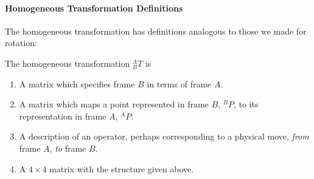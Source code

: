 \paragraph{Homogeneous Transformation Definitions}\label{HTDefs}
The homogeneous transformation has definitions analogous to those we made for rotation:


The homogeneous transformation $^A_BT$ is

\begin{enumerate}
  \item A matrix which specifies frame $B$ in terms of frame $A$.
  \item A matrix which maps a point represented in frame $B$, $^BP$, to its representation in frame $A$, $^AP$.
  \item A description of an operator, perhaps corresponding to a physical move, {\it from} frame $A$, {\it to} frame $B$.
  \item A $4\times 4$ matrix with the structure given above.
\end{enumerate}


